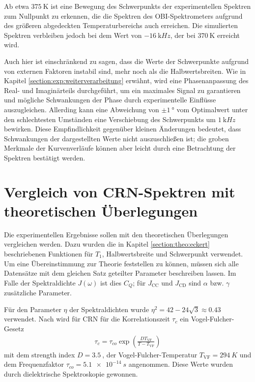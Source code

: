 Ab etwa $\SI{375}{\kelvin}$ ist eine Bewegung des Schwerpunkts der experimentellen Spektren zum Nullpunkt zu erkennen, die die Spektren des OBI-Spektrometers aufgrund des größeren abgedeckten Temperaturbereichs auch erreichen. Die simulierten Spektren verbleiben jedoch bei dem Wert von $\SI{-16}{\kilo Hz}$, der bei $\SI{370}{\kelvin}$ erreicht wird.

Auch hier ist einschränkend zu sagen, dass die Werte der Schwerpunkte aufgrund von externen Faktoren instabil sind, mehr noch als die Halbwertsbreiten. Wie in Kapitel \ref{section:exp:weiterverarbeitung} erwähnt, wird eine Phasenanpassung des Real- und Imaginärteils durchgeführt, um ein maximales Signal zu garantieren und mögliche Schwankungen der Phase durch experimentelle Einflüsse auszugleichen. Allerding kann eine Abweichung von $\pm \SI{1}{\degree}$ vom Optimalwert unter den schlechtesten Umständen eine Verschiebung des Schwerpunkts um $\SI{1}{\kilo Hz}$ bewirken. Diese Empfindlichkeit gegenüber kleinen Änderungen bedeutet, dass Schwankungen der dargestellten Werte nicht auszuschließen ist; die groben Merkmale der Kurvenverläufe können aber leicht durch eine Betrachtung der Spektren bestätigt werden.




\section{Vergleich von CRN-Spektren mit theoretischen Überlegungen} \label{section:res:theorie}

Die experimentellen Ergebnisse sollen mit den theoretischen Überlegungen vergleichen werden. Dazu wurden die in Kapitel \ref{section:theo:eckert} beschriebenen Funktionen für $T_1$, Halbwertsbreite und Schwerpunkt verwendet. Um eine Übereinstimmung zur Theorie feststellen zu können, müssen sich alle Datensätze mit dem gleichen Satz geteilter Parameter beschreiben lassen. Im Falle der Spektraldichte $J(\omega)$ ist dies $C_Q$; für $J_\text{CC}$ und $J_\text{CD}$ sind $\alpha$ bzw. $\gamma$ zusätzliche Parameter.

Für den Parameter $\eta$ der Spektraldichten wurde $\eta^2 = 42 - 24 \sqrt{3} \approx \SI{0.43}{}$ \cite{caer} verwendet. Nach \cite{PIMENOV199793} wird für CRN für die Korrelationszeit $\tau_c$ ein Vogel-Fulcher-Gesetz
\begin{align}
	\tau_c = \tau_{co} \exp \left( \frac{D T_\text{VF}}{T-T_\text{VF}} \right)
\end{align}
mit dem strength index $D = \SI{3.5}{}$, der Vogel-Fulcher-Temperatur $T_\text{VF} = \SI{294}{K}$ und dem Frequenzfaktor $\tau_{co} = \SI{5.1e-14}{s}$ angenommen. Diese Werte wurden durch dielektrische Spektroskopie gewonnen.

